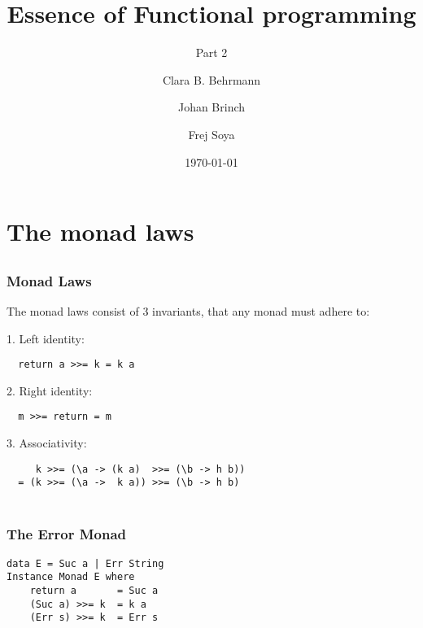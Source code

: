 \documentclass{beamer}
\title{Essence of Functional programming}
\subtitle{Part 2}
\author{Clara B. Behrmann \and Johan Brinch  \and  Frej Soya}
\date{\today}
\newcommand{\bind}{\texttt{>>=}}
\newcommand{\ret}{\texttt{return}}
\newcommand{\bs}{\texttt{\char`\\}}
\newcommand{\at}{\texttt{a}}
\newcommand{\mt}{\texttt{k}}
\begin{document}
\begin{frame}
  \titlepage
\end{frame}

\begin{frame}
  \tableofcontents
\end{frame}


\section{The monad laws}
\subsection{}
\begin{frame}[fragile]
 \frametitle{Monad Laws}
The monad laws consist of 3 invariants, that any monad must adhere to:

1. Left identity:
\begin{lstlisting}
  return a >>= k = k a
\end{lstlisting}

2. Right identity:
\begin{lstlisting}
  m >>= return = m
\end{lstlisting}

3. Associativity:
\begin{lstlisting}
     k >>= (\a -> (k a)  >>= (\b -> h b)) 
  = (k >>= (\a ->  k a)) >>= (\b -> h b)
\end{lstlisting}
\begin{align*}
\end{align*}
\end{frame}
\begin{frame}[fragile]
\frametitle{The Error Monad}
\begin{lstlisting}
data E = Suc a | Err String
Instance Monad E where
    return a       = Suc a     
    (Suc a) >>= k  = k a
    (Err s) >>= k  = Err s
\end{lstlisting}
\end{frame}
\end{document}
